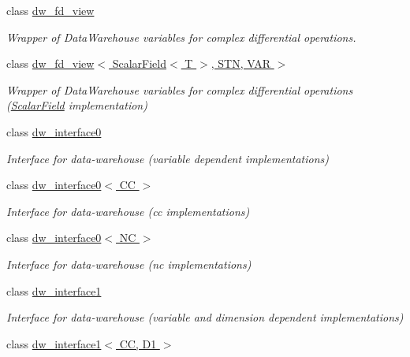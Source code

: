 \begin{DoxyCompactItemize}
class \hyperlink{classUintah_1_1PhaseField_1_1detail_1_1dw__fd__view}{dw\+\_\+fd\+\_\+view}
\begin{DoxyCompactList}\small\item\em Wrapper of Data\+Warehouse variables for complex differential operations. \end{DoxyCompactList}\item 
class \hyperlink{classUintah_1_1PhaseField_1_1detail_1_1dw__fd__view_3_01ScalarField_3_01T_01_4_00_01STN_00_01VAR_01_4}{dw\+\_\+fd\+\_\+view$<$ Scalar\+Field$<$ T $>$, S\+T\+N, V\+A\+R $>$}
\begin{DoxyCompactList}\small\item\em Wrapper of Data\+Warehouse variables for complex differential operations (\hyperlink{structUintah_1_1PhaseField_1_1ScalarField}{Scalar\+Field} implementation) \end{DoxyCompactList}\item 
class \hyperlink{classUintah_1_1PhaseField_1_1detail_1_1dw__interface0}{dw\+\_\+interface0}
\begin{DoxyCompactList}\small\item\em Interface for data-\/warehouse (variable dependent implementations) \end{DoxyCompactList}\item 
class \hyperlink{classUintah_1_1PhaseField_1_1detail_1_1dw__interface0_3_01CC_01_4}{dw\+\_\+interface0$<$ C\+C $>$}
\begin{DoxyCompactList}\small\item\em Interface for data-\/warehouse (cc implementations) \end{DoxyCompactList}\item 
class \hyperlink{classUintah_1_1PhaseField_1_1detail_1_1dw__interface0_3_01NC_01_4}{dw\+\_\+interface0$<$ N\+C $>$}
\begin{DoxyCompactList}\small\item\em Interface for data-\/warehouse (nc implementations) \end{DoxyCompactList}\item 
class \hyperlink{classUintah_1_1PhaseField_1_1detail_1_1dw__interface1}{dw\+\_\+interface1}
\begin{DoxyCompactList}\small\item\em Interface for data-\/warehouse (variable and dimension dependent implementations) \end{DoxyCompactList}\item 
class \hyperlink{classUintah_1_1PhaseField_1_1detail_1_1dw__interface1_3_01CC_00_01D1_01_4}{dw\+\_\+interface1$<$ C\+C, D1 $>$}

\end{DoxyCompactItemize}
